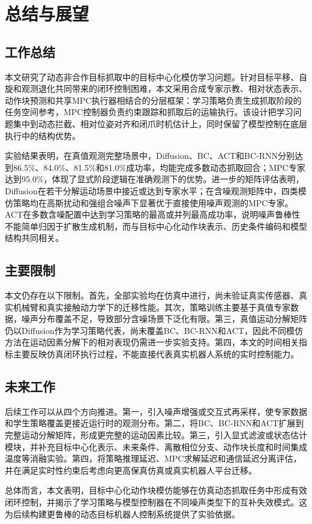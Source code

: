 \chapter{总结与展望}\label{chap:conclusion}

\section{工作总结}

本文研究了动态非合作目标抓取中的目标中心化模仿学习问题。针对目标平移、自旋和观测退化共同带来的闭环控制困难，本文采用合成专家示教、相对状态表示、动作块预测和共享MPC执行器相结合的分层框架：学习策略负责生成抓取阶段的任务空间参考，MPC控制器负责约束跟踪和抓取后的运输执行。该设计把学习问题集中到动态拦截、相对位姿对齐和闭爪时机估计上，同时保留了模型控制在底层执行中的结构优势。

实验结果表明，在真值观测完整场景中，Diffusion、BC、ACT和BC-RNN分别达到86.5\%、84.0\%、81.5\%和81.0\%成功率，均能完成多数动态抓取回合；MPC专家达到95.0\%，体现了显式阶段逻辑在准确观测下的优势。进一步的矩阵评估表明，Diffusion在若干分解运动场景中接近或达到专家水平；在含噪观测矩阵中，四类模仿策略均在高斯扰动和强组合噪声下显著优于直接使用噪声观测的MPC专家。ACT在多数含噪配置中达到学习策略的最高或并列最高成功率，说明噪声鲁棒性不能简单归因于扩散生成机制，而与目标中心化动作块表示、历史条件编码和模型结构共同相关。

\section{主要限制}

本文仍存在以下限制。首先，全部实验均在仿真中进行，尚未验证真实传感器、真实机械臂和真实接触动力学下的迁移性能。其次，策略训练主要基于真值专家数据，噪声分布覆盖不足，导致部分含噪场景下泛化有限。第三，真值运动分解矩阵仍以Diffusion作为学习策略代表，尚未覆盖BC、BC-RNN和ACT，因此不同模仿方法在运动因素分解下的相对表现仍需进一步实验支持。第四，本文的时间相关指标主要反映仿真闭环执行过程，不能直接代表真实机器人系统的实时控制能力。

\section{未来工作}

后续工作可以从四个方向推进。第一，引入噪声增强或交互式再采样，使专家数据和学生策略覆盖更接近运行时的观测分布。第二，将BC、BC-RNN和ACT扩展到完整运动分解矩阵，形成更完整的运动因素比较。第三，引入显式滤波或状态估计模块，并补充目标中心化表示、未来条件、离散相位分支、动作块长度和时间集成温度等消融实验。第四，将策略推理延迟、MPC求解延迟和通信延迟分离评估，并在满足实时性约束后考虑向更高保真仿真或真实机器人平台迁移。

总体而言，本文表明，目标中心化动作块模仿能够在仿真动态抓取任务中形成有效闭环控制，并揭示了学习策略与模型控制器在不同噪声类型下的互补失效模式。这为后续构建更鲁棒的动态目标机器人控制系统提供了实验依据。
